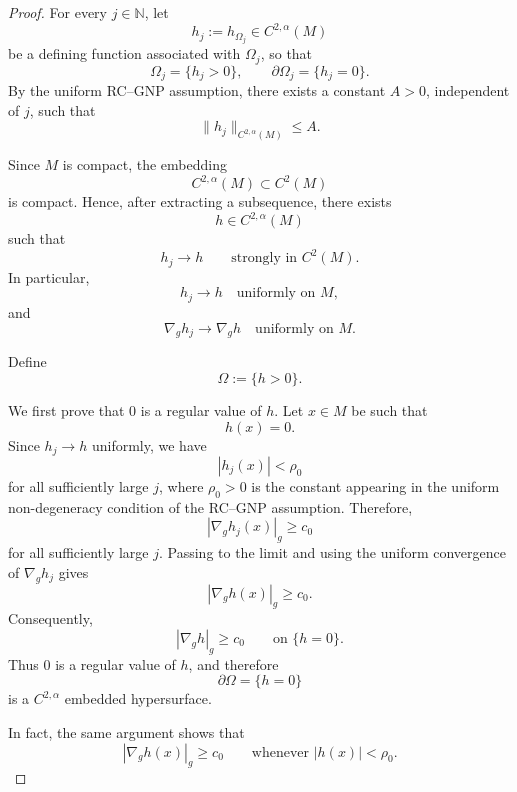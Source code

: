 \documentclass[10pt,a4paper]{amsart}
\begin{document}
\begin{proof}
For every $j\in\mathbb N$, let
\[
h_j:=h_{\Omega_j}\in C^{2,\alpha}(M)
\]
be a defining function associated with $\Omega_j$, so that
\begin{equation}
\Omega_j=\{h_j>0\},
\qquad
\partial\Omega_j=\{h_j=0\}.
\label{eq:compactness-defining-functions}
\end{equation}
By the uniform RC--GNP assumption, there exists a constant
$A>0$, independent of $j$, such that
\begin{equation}
\|h_j\|_{C^{2,\alpha}(M)}\le A.
\label{eq:compactness-uniform-C2alpha}
\end{equation}

Since $M$ is compact, the embedding
\[
C^{2,\alpha}(M)\subset C^2(M)
\]
is compact. Hence, after extracting a subsequence, there exists
\[
h\in C^{2,\alpha}(M)
\]
such that
\begin{equation}
h_j\longrightarrow h
\qquad\text{strongly in }C^2(M).
\label{eq:compactness-C2-convergence}
\end{equation}
In particular,
\[
h_j\longrightarrow h
\quad\text{uniformly on }M,
\]
and
\[
\nabla_g h_j\longrightarrow\nabla_g h
\quad\text{uniformly on }M.
\]

Define
\begin{equation}
\Omega:=\{h>0\}.
\label{eq:compactness-limit-domain}
\end{equation}

We first prove that $0$ is a regular value of $h$. Let
$x\in M$ be such that
\[
h(x)=0.
\]
Since $h_j\to h$ uniformly, we have
\[
|h_j(x)|<\rho_0
\]
for all sufficiently large $j$, where $\rho_0>0$ is the constant
appearing in the uniform non-degeneracy condition of the RC--GNP
assumption. Therefore,
\[
|\nabla_g h_j(x)|_g\ge c_0
\]
for all sufficiently large $j$. Passing to the limit and using the
uniform convergence of $\nabla_g h_j$ gives
\[
|\nabla_g h(x)|_g\ge c_0.
\]
Consequently,
\begin{equation}
|\nabla_g h|_g\ge c_0
\qquad\text{on }\{h=0\}.
\label{eq:compactness-limit-nondegeneracy}
\end{equation}
Thus $0$ is a regular value of $h$, and therefore
\[
\partial\Omega=\{h=0\}
\]
is a $C^{2,\alpha}$ embedded hypersurface.

In fact, the same argument shows that
\begin{equation}
|\nabla_g h(x)|_g\ge c_0
\qquad
\text{whenever }|h(x)|<\rho_0.
\label{eq:compactness-limit-nondegeneracy-neighborhood}
\end{equation}


\end{proof}
\end{document}

